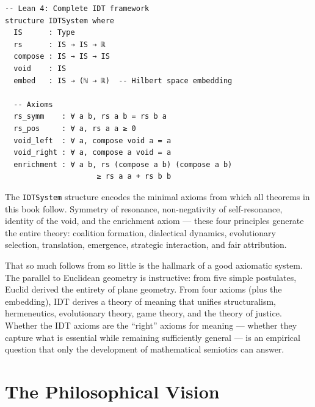 \begin{lstlisting}
-- Lean 4: Complete IDT framework
structure IDTSystem where
  IS      : Type
  rs      : IS → IS → ℝ
  compose : IS → IS → IS
  void    : IS
  embed   : IS → (ℕ → ℝ)  -- Hilbert space embedding

  -- Axioms
  rs_symm    : ∀ a b, rs a b = rs b a
  rs_pos     : ∀ a, rs a a ≥ 0
  void_left  : ∀ a, compose void a = a
  void_right : ∀ a, compose a void = a
  enrichment : ∀ a b, rs (compose a b) (compose a b)
                     ≥ rs a a + rs b b
\end{lstlisting}

\begin{interpretation}
The \texttt{IDTSystem} structure encodes the minimal axioms from which
all theorems in this book follow.  Symmetry of resonance, non-negativity
of self-resonance, identity of the void, and the enrichment axiom ---
these four principles generate the entire theory: coalition formation,
dialectical dynamics, evolutionary selection, translation, emergence,
strategic interaction, and fair attribution.

That so much follows from so little is the hallmark of a good axiomatic
system.  The parallel to Euclidean geometry is instructive: from five
simple postulates, Euclid derived the entirety of plane geometry.  From
four axioms (plus the embedding), IDT derives a theory of meaning that
unifies structuralism, hermeneutics, evolutionary theory, game theory,
and the theory of justice.  Whether the IDT axioms are the ``right''
axioms for meaning --- whether they capture what is essential while
remaining sufficiently general --- is an empirical question that only the
development of mathematical semiotics can answer.
\end{interpretation}

\section{The Philosophical Vision}


